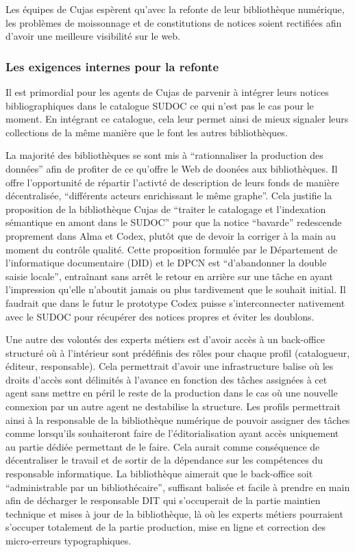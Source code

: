 Les équipes de Cujas espèrent qu'avec la refonte de leur bibliothèque numérique, les problèmes de moissonnage et de constitutions de notices soient rectifiées afin d'avoir une meilleure visibilité sur le web. 
\subsubsection*{Les exigences internes pour la refonte}
Il est primordial pour les agents de Cujas de parvenir à intégrer leurs notices bibliographiques dans le catalogue SUDOC ce qui n'est pas le cas pour le moment. En intégrant ce catalogue, cela leur permet ainsi de mieux signaler leurs collections de la même manière que le font les autres bibliothèques. 

La majorité des bibliothèques se sont mis à \enquote{rationnaliser la production des données} afin de profiter de ce qu'offre le Web de doonées aux bibliothèques. Il offre l'opportunité de répartir l'activté de description de leurs fonds de manière décentralisée, \enquote{différents acteurs enrichissant le même graphe}. Cela justifie la proposition de la bibliothèque Cujas de \enquote{traiter le catalogage et l'indexation sémantique en amont dans  le SUDOC} pour que la notice \enquote{bavarde} redescende proprement dans Alma et Codex, plutôt que de devoir la corriger à la main au moment du contrôle qualité. Cette proposition formulée par le Département de l'informatique documentaire (DID) et le DPCN est \enquote{d'abandonner la double saisie locale}, entraînant sans arrêt le retour en arrière sur une tâche en ayant l'impression qu'elle n'aboutit jamais ou plus tardivement que le souhait initial. Il faudrait que dans le futur le prototype Codex puisse s'interconnecter nativement avec le SUDOC pour récupérer des notices propres et éviter les doublons. 

Une autre des volontés des experts métiers est d'avoir accès à un back-office structuré où à l'intérieur sont prédéfinis des rôles pour chaque profil (catalogueur, éditeur, responsable). Cela permettrait d'avoir une infrastructure balise où les droits d'accès sont délimités à l'avance en fonction des tâches assignées à cet agent sans mettre en péril le reste de la production dans le cas où une nouvelle connexion par un autre agent ne destabilise la structure. Les profils permettrait ainsi à la responsable de la bibliothèque numérique de pouvoir assigner des tâches comme lorsqu'ils souhaiteront faire de l'éditorialisation ayant accès uniquement au partie dédiée permettant de le faire. Cela aurait comme conséquence de décentraliser le travail et de sortir de la dépendance sur les compétences du responsable informatique. La bibliothèque aimerait que le back-office soit \enquote{administrable par un bibliothécaire}, suffisant balisée et facile à prendre en main afin de décharger le responsable DIT qui s'occuperait de la partie maintien technique et mises à jour de la bibliothèque, là où les experts métiers pourraient s'occuper totalement de la partie production, mise en ligne et correction des micro-erreurs typographiques. 

